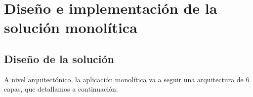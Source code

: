 \documentclass[11pt,spanish,listoffigures]{tfgetsinf}
\begin{document}
%

\chapter{Diseño e implementación de la solución monolítica}

\section{Diseño de la solución} \label{sct:DiseñoMonolitico}

A nivel arquitectónico, la aplicación monolítica va a seguir una arquitectura de 6 capas, que detallamos a continuación:
\end{document}
